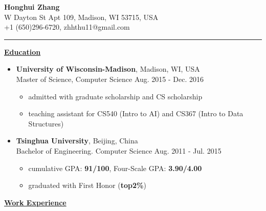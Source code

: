 \documentclass[11pt]{article}
\begin{document}
\begin{CJK}{GBK}{kai}
\begin{center}
  {\textbf{\huge Honghui Zhang}}\\ W Dayton St Apt 109, Madison, WI 53715, USA\\
  +1 (650)296-6720, zhhthu11@gmail.com\\
\end{center}
\rule[4pt]{18.5cm}{0.5pt}
{ \textbf{\underline{Education}}}\\\medskip
\begin{itemize}
  \item \textbf{University of Wisconsin-Madison}, Madison, WI, USA\\
  Master of Science, Computer Science  \hfill Aug. 2015 - Dec. 2016\\
    \begin{itemize}
    \item admitted with graduate scholarship and CS scholarship
    \item teaching assistant for CS540 (Intro to AI) and CS367 (Intro to Data Structures)\\\medskip
    \end{itemize}
 \item \textbf{Tsinghua University}, Beijing, China\\
 Bachelor of Engineering. Computer Science \hfill Aug. 2011 - Jul. 2015\\
    \begin{itemize}
    \item cumulative GPA: \textbf{91/100}, Four-Scale GPA: \textbf{3.90/4.00}
    \item graduated with First Honor (\textbf{top2\%})
    \end{itemize}
\end{itemize}

\bigskip

{\textbf{\underline{Work Experience}}}\\\medskip

\begin{itemize}


\end{itemize}
\end{CJK}
\end{document}
